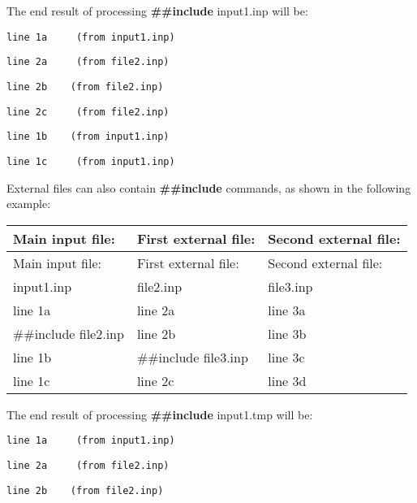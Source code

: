 The end result of processing \textbf{\#\#include} input1.inp will be:

\begin{lstlisting}
line 1a     (from input1.inp)
\end{lstlisting}

\begin{lstlisting}
line 2a     (from file2.inp)
\end{lstlisting}

\begin{lstlisting}
line 2b    (from file2.inp)
\end{lstlisting}

\begin{lstlisting}
line 2c     (from file2.inp)
\end{lstlisting}

\begin{lstlisting}
line 1b    (from input1.inp)
\end{lstlisting}

\begin{lstlisting}
line 1c     (from input1.inp)
\end{lstlisting}

External files can also contain \textbf{\#\#include} commands, as shown in the following example:

\begin{longtable}[c]{@{}lll@{}}
\toprule 
Main input file: & First external file: & Second external file: \tabularnewline
\midrule
\endfirsthead

\toprule 
Main input file: & First external file: & Second external file: \tabularnewline
\midrule
\endhead

input1.inp & file2.inp & file3.inp \tabularnewline
line 1a & line 2a & line 3a \tabularnewline
\#\#include file2.inp & line 2b & line 3b \tabularnewline
line 1b & \#\#include file3.inp & line 3c \tabularnewline
line 1c & line 2c & line 3d \tabularnewline
\bottomrule
\end{longtable}

The end result of processing \textbf{\#\#include} input1.tmp will be:

\begin{lstlisting}
line 1a     (from input1.inp)
\end{lstlisting}

\begin{lstlisting}
line 2a     (from file2.inp)
\end{lstlisting}

\begin{lstlisting}
line 2b    (from file2.inp)
\end{lstlisting}

